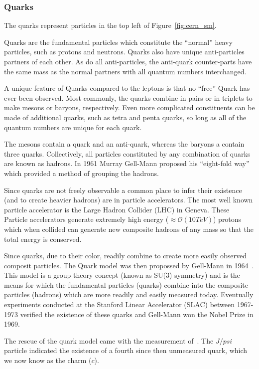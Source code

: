 \subsubsection{Quarks}

The quarks represent particles in the top left of Figure~\ref{fig:cern_sm}.

Quarks are the fundamental particles which constitute the ``normal'' heavy particles, such as protons and neutrons.
Quarks also have unique anti-particles partners of each other.
As do all anti-particles, the anti-quark counter-parts have the same mass as the normal partners with all quantum numbers interchanged.

A unique feature of Quarks compared to the leptons is that no ``free'' Quark has ever been observed.
Most commonly, the quarks combine in pairs or in triplets to make mesons or baryons, respectively.
Even more complicated constituents can be made of additional quarks, such as tetra and penta quarks, so long as all of the quantum numbers are unique for each quark.

The mesons contain a quark and an anti-quark, whereas the baryons a contain three quarks.
Collectively, all particles constituted by any combination of quarks are known as hadrons.
In 1961 Murray Gell-Mann proposed his ``eight-fold way''~\citep{eightfold_way_osti_4008239} which provided a method of grouping the hadrons.

Since quarks are not freely observable a common place to infer their existence (and to create heavier hadrons) are in particle accelerators.
The most well known particle accelerator is the Large Hadron Collider (LHC) in Geneva.
These Particle accelerators generate extremely high energy ($\approx \mathcal{O}(10 TeV)$) protons which when collided can generate new composite hadrons of any mass so that the total energy is conserved.

Since quarks, due to their color, readily combine to create more easily observed composit particles.
The Quark model was then propossed by Gell-Mann in 1964~\citep{quark_model_GELLMANN1964214}.
This model is a group theory concept (known as SU(3) symmetry) and is the means for which the fundamental particles (quarks) combine into the composite particles (hadrons) which are more readily and easily measured today.
Eventually experiments conducted at the Stanford Linear Accelerator (SLAC) between 1967-1973 verified the existence of these quarks and Gell-Mann won the Nobel Prize in 1969.

The rescue of the quark model came with the measurement of~\citep{Jpsi_PhysRevLett.33.1404}.
The $J/psi$ particle indicated the existence of a fourth since then unmeasured quark, which we now know as the charm ($c$).



